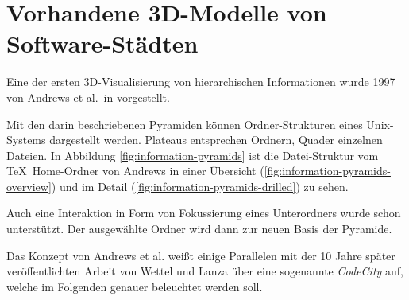 \section{Vorhandene 3D-Modelle von Software-Städten}

Eine der ersten 3D-Visualisierung von hierarchischen Informationen wurde 1997 von Andrews et al.\ in \cite{andrews1997information} vorgestellt. 

Mit den darin beschriebenen Pyramiden können Ordner-Strukturen eines Unix-Systems dargestellt werden. Plateaus entsprechen Ordnern, Quader einzelnen Dateien. In Abbildung \ref{fig:information-pyramids} ist die Datei-Struktur vom \TeX~Home-Ordner von Andrews in einer Übersicht (\ref{fig:information-pyramids-overview}) und im Detail (\ref{fig:information-pyramids-drilled}) zu sehen.

Auch eine Interaktion in Form von Fokussierung eines Unterordners wurde schon unterstützt. Der ausgewählte Ordner wird dann zur neuen Basis der Pyramide.

Das Konzept von Andrews et al. weißt einige Parallelen mit der 10 Jahre später veröffentlichten Arbeit von Wettel und Lanza über eine sogenannte \textit{CodeCity} \cite{wettel2007Program} auf, welche im Folgenden genauer beleuchtet werden soll.

